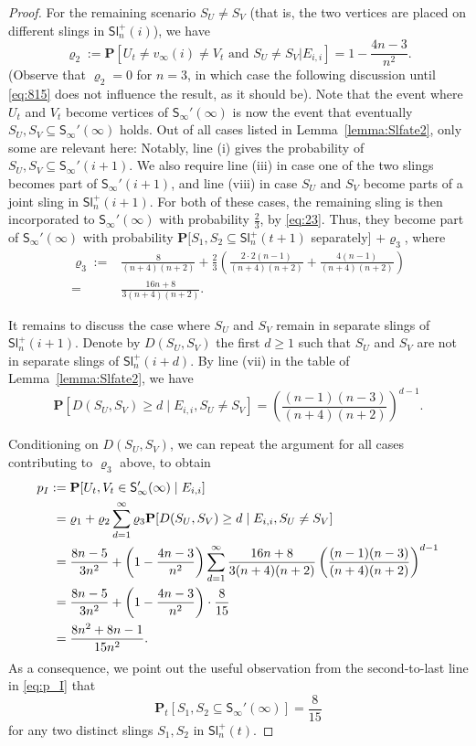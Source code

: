 \documentclass[a4paper,11pt,reqno]{amsart}
\newcommand{\paul}[1]{\todo[color=yellow!70,inline]{Paul: #1}}
\newcommand{\fabian}[1]{\todo[color=red!50,inline]{Fabian: #1}}
\newcommand{\bP}{\mathbf{P}}
\newcommand{\Slr}{\mathsf{Sl}^+}
\newcommand{\Soo}{\mathsf{S}_\infty}
\newcommand{\ssq}{\subseteq}
\theoremstyle{definition}
\begin{document}
\begin{proof}
 For the remaining scenario $S_U\neq S_V$ (that is, the two vertices are placed on different slings in $\Slr_n(i)$), we have 
 \[
  \varrho_2:=\bP[U_t\neq v_\infty(i)\neq V_t\text{ and }S_U\neq S_V|E_{i,i}]=1-\frac{4n-3}{n^2}.
 \]
 (Observe that $\varrho_2=0$ for $n=3$, in which case the following discussion until \eqref{eq:815} does not influence the result, as it should be). Note that the event where $U_t$ and $V_t$ become vertices of $\Soo'(\infty)$ is now the event that eventually $S_U,S_V\ssq\Soo'(\infty)$ holds.  
 Out of all cases listed in Lemma~\ref{lemma:Slfate2}, only some are relevant here: Notably, line (i) gives the probability of $S_U,S_V\ssq\Soo'(i+1)$. We also require line (iii) in case one of the two slings becomes part of $\Soo'(i+1)$, and line (viii) in case $S_U$ and $S_V$ become parts of a joint sling in $\Slr_n(i+1)$. For both of these cases, the remaining sling is then incorporated to $\Soo'(\infty)$ with probability $\frac{2}{3}$, by \eqref{eq:23}. Thus, they become part of $\Soo'(\infty)$ with probability $\mathbf{P}[S_1,S_2 \ssq \Slr_n(t+1)$ separately$]$ $+\varrho_3$, where 
 \begin{align*}
  \varrho_3:={}& \frac{8}{(n+4)(n+2)}+\frac{2}{3}\left(\frac{2\cdot 2(n-1)}{(n+4)(n+2)} + \frac{4(n-1)}{(n+4)(n+2)}\right)\\
  ={}& \frac{16n+8}{3(n+4)(n+2)}.
 \end{align*}
 
 It remains to discuss the case where $S_U$ and $S_V$ remain in separate slings of $\Slr_n(i+1)$. Denote by $D(S_U,S_V)$ the first $d\geq 1$ such that $S_U$ and $S_V$ are not in separate slings of $\Slr_n(i+d)$. By line (vii) in the table of Lemma~\ref{lemma:Slfate2}, we have 
 \[
  \bP[D(S_U,S_V)\geq d\mid E_{i,i}, S_U \neq S_V] 
  = \left(\frac{(n-1)(n-3)}{(n+4)(n+2)}\right)^{d-1}.
 \]

 
 Conditioning on $D(S_U,S_V)$, we can repeat the argument for all cases contributing to $\varrho_3$ above, to obtain 
 \begin{align}\label{eq:p_I}
  p_I:={}& \bP[U_t,V_t\in \Soo'(\infty)\mid E_{i,i}]\notag \\
   ={}& \varrho_1 + \varrho_2 \sum_{d=1}^\infty \varrho_3\bP[D(S_U,S_V)\geq d\mid E_{i,i}, S_U \neq S_V]\notag \\
   ={}& \frac{8n-5}{3n^2} + \left(1-\frac{4n-3}{n^2}\right)\sum_{d=1}^\infty \frac{16n+8}{3(n+4)(n+2)}\left(\frac{(n-1)(n-3)}{(n+4)(n+2)}\right)^{d-1} \notag \\
   ={}& \frac{8n-5}{3n^2} + \left(1-\frac{4n-3}{n^2}\right)\cdot \frac{8}{15}\notag \\
   ={}& \frac{8n^2+8n-1}{15n^2}.
 \end{align}
 As a consequence, we point out the useful observation from the second-to-last line in \eqref{eq:p_I} that 
 \begin{equation}\label{eq:815}
  \bP_t[S_1,S_2\ssq \Soo'(\infty)]=\frac{8}{15}
 \end{equation}
 for any two distinct slings $S_1,S_2$ in $\Slr_n(t)$. 
 

\end{proof}
\end{document}
